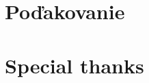 \thispagestyle{empty}

\vspace*{\fill}

\ifx\FIITlagEN\undefined
\section*{Poďakovanie}
\else
\section*{Special thanks}
\fi


\emptypage